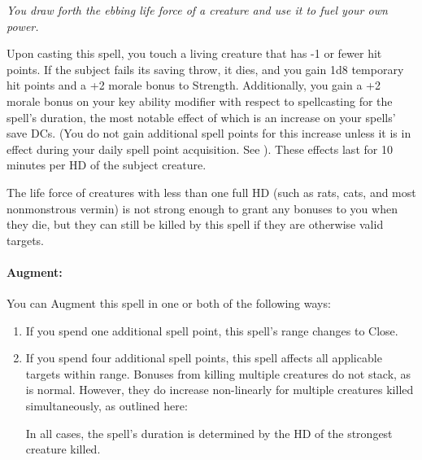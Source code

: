 \emph{You draw forth the ebbing life force of a creature and use it to fuel your own power. }

Upon casting this spell, you touch a living creature that has -1 or fewer hit points. 
If the subject fails its saving throw, it dies, and you gain 1d8 temporary hit points and a +2 morale bonus to Strength. 
Additionally, you gain a +2 morale bonus on your key ability modifier with respect to spellcasting for the spell's duration,
the most notable effect of which is an increase on your spells' save DCs.
(You do not gain additional spell points for this increase unless it is in effect during your daily spell point acquisition.
 See ).
These effects last for 10 minutes per HD of the subject creature. 

The life force of creatures with less than one full HD (such as rats, cats, and most nonmonstrous vermin) is not strong enough
to grant any bonuses to you when they die, but they can still be killed by this spell if they are otherwise valid targets.

\paragraph{Augment:} You can Augment this spell in one or both of the following ways:
\begin{enumerate}
 \item If you spend one additional spell point, this spell's range changes to Close.
 \item If you spend four additional spell points, this spell affects all applicable targets within range.
 Bonuses from killing multiple creatures do not stack, as is normal.
 However, they do increase non-linearly for multiple creatures killed simultaneously, as outlined here:
 In all cases, the spell's duration is determined by the HD of the strongest creature killed.
\end{enumerate}

